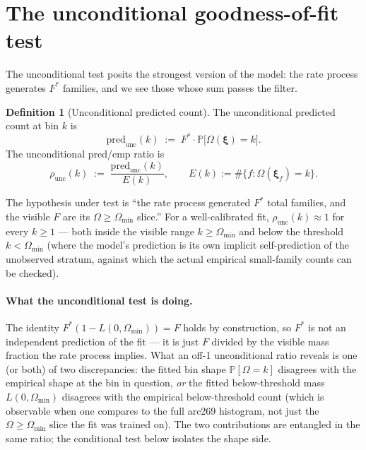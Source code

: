 \documentclass[11pt]{article}
\newcommand{\PROB}{\mathbb{P}}
\newcommand{\1}{\mathbf{1}}
\newcommand{\Prof}{\boldsymbol{\xi}}
\newcommand{\Om}{\Omega}
\theoremstyle{definition}
\newtheorem{definition}[theorem]{Definition}
\begin{document}
\section{The unconditional goodness-of-fit test}
\label{sec:uncond}

The unconditional test posits the strongest version of the model:
the rate process generates $F^*$ families, and we see those whose
sum passes the filter.

\begin{definition}[Unconditional predicted count]\label{def:uncond}
The unconditional predicted count at bin $k$ is
\begin{equation}
\mathrm{pred}_{\mathrm{unc}}(k)
\;:=\;
F^* \cdot \PROB\bigl[\Om(\Prof) = k\bigr].
\label{eq:pred-uncond}
\end{equation}
The unconditional pred/emp ratio is
\begin{equation}
\rho_{\mathrm{unc}}(k)
\;:=\;
\frac{\mathrm{pred}_{\mathrm{unc}}(k)}{E(k)},
\qquad
E(k) := \#\{f : \Om(\Prof_f) = k\}.
\label{eq:rho-uncond}
\end{equation}
\end{definition}

The hypothesis under test is ``the rate process generated $F^*$ total
families, and the visible $F$ are its $\Om \ge \Om_{\min}$ slice.''
For a well-calibrated fit, $\rho_{\mathrm{unc}}(k)\approx 1$ for
every $k\ge 1$ --- both inside the visible range
$k\ge\Om_{\min}$ and below the threshold $k < \Om_{\min}$ (where the
model's prediction is its own implicit self-prediction of the
unobserved stratum, against which the actual empirical small-family
counts can be checked).

\paragraph{What the unconditional test is doing.}
The identity $F^*(1-L(0,\Om_{\min}))=F$ holds by construction, so
$F^*$ is not an independent prediction of the fit --- it is just $F$
divided by the visible mass fraction the rate process implies.
What an off-1 unconditional ratio reveals is one (or both) of two
discrepancies: the fitted bin shape $\PROB[\Om=k]$ disagrees with
the empirical shape at the bin in question, \emph{or} the fitted
below-threshold mass $L(0,\Om_{\min})$ disagrees with the empirical
below-threshold count (which is observable when one compares to
the full arc269 histogram, not just the $\Om\ge\Om_{\min}$ slice
the fit was trained on). The two contributions are entangled in
the same ratio; the conditional test below isolates the shape side.
\end{document}
